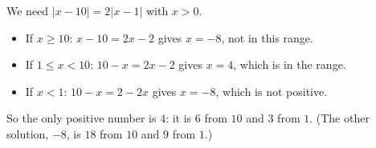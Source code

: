 We need $|x-10|=2|x-1|$ with $x>0$.
\begin{itemize}
\item If $x\ge10$: $x-10=2x-2$ gives $x=-8$, not in this range.
\item If $1\le x<10$: $10-x=2x-2$ gives $x=4$, which is in the range.
\item If $x<1$: $10-x=2-2x$ gives $x=-8$, which is not positive.
\end{itemize}
So the only positive number is $\boxed{4}$: it is $6$ from $10$ and $3$ from $1$. (The other solution, $-8$, is $18$ from $10$ and $9$ from $1$.)
